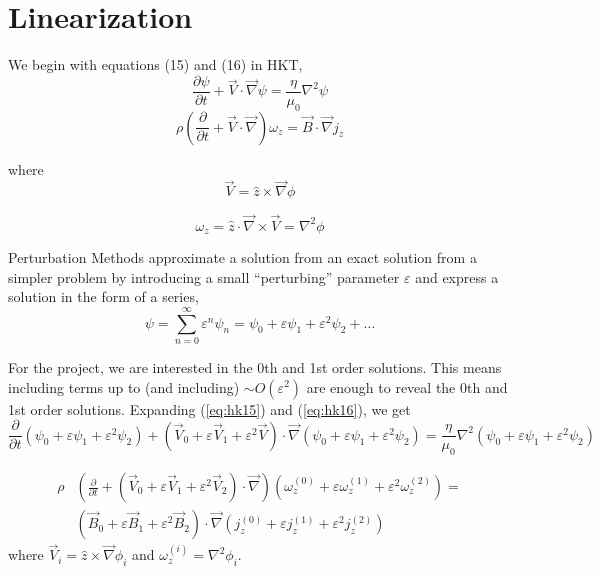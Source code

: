 \documentclass{article}
\begin{document}
\section{Linearization}
We begin with equations (15) and (16) in HKT,
\begin{equation}
    \frac{\partial \psi}{\partial t} + \vec{V}\cdot \vec{\nabla} \psi= \frac{\eta}{\mu_0} \nabla ^2 \psi
\end{equation} 
\begin{equation}
    \rho\left( \frac{\partial }{\partial t} + \vec{V}\cdot \vec{\nabla} \right)\omega_z = \vec{B}\cdot \vec{\nabla}j_z
\end{equation} 

where
\begin{equation}
    \label{eq:hk15}
    \vec{V}= \hat{z}\times \vec{\nabla}\phi
\end{equation} 

\begin{equation}
    \label{eq:hk16}
    \omega_z = \hat{z}\cdot \vec{\nabla}\times \vec{V}=\nabla ^{2}\phi
\end{equation} 

Perturbation Methods approximate a solution from an exact solution from a simpler problem by introducing a small
``perturbing'' parameter $\varepsilon$ and express a solution in the form of a series,
\begin{equation}
    \psi=\sum_{n=0}^{\infty} \varepsilon^{n}\psi_n=\psi_0+\varepsilon\psi_1+\varepsilon^{2}\psi_2+\ldots
\end{equation} 

For the project, we are interested in the 0th and 1st order solutions. This means including terms up to (and including) $\sim O(\varepsilon^2)$ are
enough to reveal the 0th and 1st order solutions. Expanding (\ref{eq:hk15}) and (\ref{eq:hk16}), we get
\begin{equation}
    \frac{\partial}{\partial t} \left(\psi_0+\varepsilon\psi_1+\varepsilon^{2}\psi_2 \right) + \left( \vec{V}_0 + \varepsilon \vec{V}_1 + \varepsilon^2 \vec{V} \right) \cdot \vec{\nabla} \left(\psi_0+\varepsilon\psi_1+\varepsilon^{2}\psi_2 \right) = \frac{\eta}{\mu_0}\nabla ^{2} \left( \psi_0+\varepsilon\psi_1+\varepsilon^{2}\psi_2 \right) 
\end{equation} 

\begin{equation}
    \begin{split}
        \rho&\left( \frac{\partial }{\partial t} + \left( \vec{V}_0 + \varepsilon \vec{V}_1 + \varepsilon^2 \vec{V}_2 \right) \cdot \vec{\nabla} \right) \left(\omega_z^{(0)} + \varepsilon \omega_z^{(1)} + \varepsilon ^{2} \omega_z^{(2)} \right) =\\
        &\left( \vec{B}_0 + \varepsilon \vec{B}_1 + \varepsilon^2 \vec{B}_2 \right) \cdot \vec{\nabla}\left(j_z^{(0)} + \varepsilon j_z^{(1)} + \varepsilon^2 j_z^{(2)}  \right) 
    \end{split}
\end{equation} 
where $\vec{V}_i = \hat{z}\times \vec{\nabla} \phi_i$ and $\omega_z^{(i)}=\nabla ^{2}\phi_i.$
\end{document}
